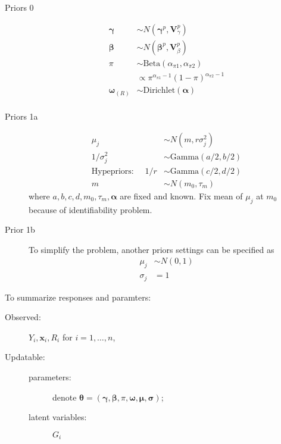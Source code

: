 \begin{description}
\item [Priors 0]
\begin{align*}
\bm \gamma                      & \sim N (\bm \gamma^p, \bm V_{\gamma}^p)                          \\
\bm \beta                       & \sim N (\bm \beta^p, \bm V_{\beta}^p)                            \\
\pi                             & \sim \mbox{Beta} (\alpha_{\pi 1},\alpha_{\pi 2})                 \\
                                & \propto \pi^{\alpha_{\pi 1} - 1} (1 - \pi) ^{\alpha_{\pi 2} - 1} \\
\bm \omega_{(R)}                      & \sim \mbox{Dirichlet}(\bm \alpha)                                \\
\end{align*}
\item[Priors 1a]
\begin{align*}
\mu_j                           & \sim N(m,  r \sigma_j^2)                                         \\
1/ \sigma_j^2                   & \sim \mbox{Gamma}(a/2, b/2)                                      \\
\mbox{Hypepriors: } \quad  1/ r & \sim \mbox{Gamma}(c/2, d/2)                                      \\
m                               & \sim N(m_0, \tau_m)
\end{align*}
where $a, b,c ,d , m_0, \tau_m, \bm \alpha$ are fixed and known.
Fix mean of $\mu_j$ at $m_0$ because of identifiability problem.

\item[Prior 1b]
To simplify the problem, another priors settings can be specified as
\begin{align*}
\mu_j & \sim N(0, 1) \\
\sigma_j & = 1
\end{align*}
\end{description}

To summarize responses and paramters:
\begin{description}
\item[Observed: ] $Y_i, \bm x_i, R_i$ for $i = 1, \ldots, n$,
\item[Updatable: ]

\begin{description}
\item[parameters:] denote $\bm \theta = (\bm \gamma, \bm \beta, \pi, \bm \omega, \bm \mu, \bm \sigma)$;
\item[latent variables:] $G_{i}$
\end{description}
\end{description}


